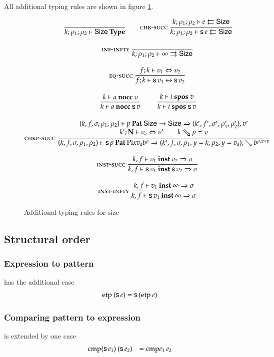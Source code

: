 All additional typing rules are shown in figure \ref{str}.
\begin{figure}
\begin{gather*}
\nru{}{}{\IsType{k}{\rho_1}{\rho_2}{\Size}}
\qquad
\nru{\chksucc}
{\Check{k}{\rho_1}{\rho_2}{e}{\Size}}
{\Check{k}{\rho_1}{\rho_2}{\s e}{\Size}} 
\\[2ex]
\nru{\infinfty}{}{\Infer{k}{\rho_1}{\rho_2}{\infty}{\Size}} 
\\[2ex]
\nru{\eqsuc}
{\EqVal{f}{k}{v_1}{v_2}}
{\FeqVal{f}{k}{\s v_1}{\s v_2}}
\\[2ex]
\nru{}
{\nocc{k}{a}{v}}
{\nocc{k}{a}{\s v}}
\qquad
\nru{}
{\spos{k}{i}{v}}
{\spos{k}{i}{\s v}}
\\[2ex]
\ndru{\chkpsucc}
{
\checkp{k,f,\sigma,\rho_1,\rho_2}{p}{\Size \ra \Size}
{k',f',\sigma',\rho'_1,\rho'_2}{v'}}
{
\EqVal{k'}{\nF}{v_a}{v'} \qquad
\ptv{k}{p} = v
}
{
\checkp
{k,f,\sigma,\rho_1,\rho_2}
{\s p}
{\vpi x v_a \cl{b}{\rho}}
{k',f,\sigma,\ins{\rho_1}{y}{k},\ins{\rho_2}{y}{v_a}}
{\wh \cl{b}{\ins{\rho}{x}{v}}}}
\\[2ex]
\nru{\unifys}
{\unify{k}{f}{v_1}{v_2}{\sigma}}
{\unify{k}{f}{\s v_1}{\s v_2}{\sigma}
}
\\[2ex]
\nru{\unifyi}
{\unify{k}{f}{v_1}{\infty}{\sigma}}
{\unify{k}{f}{\s v_1}{\infty}{\sigma}
}
\end{gather*}
\label{str}
\caption{Additional typing rules for size}
\end{figure}

\subsection{Structural order}

\subsubsection{Expression to pattern}
has the additional case
\[
\begin{array}[t]{ll}
\mathrm{etp}\: (\mathsf{s}\, e) = \mathsf{s}\, (\mathrm{etp}\: e) \\
\end{array}
\]

\subsubsection{Comparing pattern to expression}
is extended by one case
\[
\begin{array}[t]{ll}
\mathrm{cmp} (\mathsf{s}\, e_1) \: (\mathsf{s}\, e_2) & = \mathrm{cmp} e_1 \: e_2 \\
\end{array}
\]

